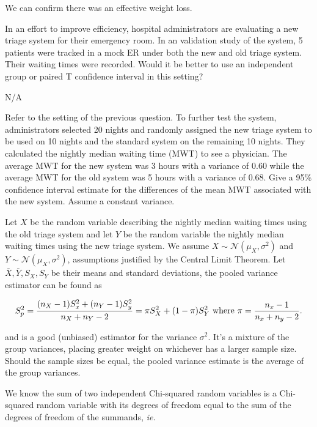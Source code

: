 \documentclass{homework}
\begin{document}
We can confirm there was an effective weight loss. \\

\begin{tcolorbox}[title=Question 4]
In an effort to improve efficiency, hospital administrators are evaluating a new triage system for their emergency room. In an validation study of the system, 5 patients were tracked in a mock ER under both the new and old triage system. Their waiting times were recorded. Would it be better to use an independent group or paired T confidence interval in this setting?
\end{tcolorbox}

N/A

\begin{tcolorbox}[title=Question 5]
Refer to the setting of the previous question. To further test the system, administrators selected 20 nights and randomly assigned the new triage system to be used on 10 nights and the standard system on the remaining 10 nights. They calculated the nightly median waiting time (MWT) to see a physician. The average MWT for the new system was 3 hours with a variance of 0.60 while the average MWT for the old system was 5 hours with a variance of 0.68. Give a 95\% confidence interval estimate for the differences of the mean MWT associated with the new system. Assume a constant variance.
\end{tcolorbox}

Let $X$ be the random variable describing the
nightly median waiting times using the old triage system and let $Y$ be the random variable the
nightly median waiting times using the new triage system. We assume $X \sim \mathcal{N}(\mu_X, \sigma^2)$ and $Y \sim \mathcal{N}(\mu_X, \sigma^2)$, assumptions justified by the Central Limit Theorem. Let $\bar X, \bar Y, S_X, S_Y$ be their means and standard deviations, the pooled variance estimator can be found as

$$
S_p^2 = \frac{(n_X-1)S_x^2 + (n_Y-1)S_y^2 }{n_X+n_Y-2} = \pi S_X^2 + (1-\pi) S_Y^2 \textnormal{  where } \pi = \frac{n_x-1}{n_x+n_y-2}.
$$

and is a good (unbiased) estimator for the variance $\sigma^2$. It's a mixture of the group variances, placing greater weight on whichever has a larger sample size. Should the sample sizes be equal, the pooled variance estimate is the average of the group variances. 

We know the sum of two independent Chi-squared random variables is a Chi-squared random variable with its degrees of freedom equal to the sum of the degrees of freedom of the summands, \textit{ie.} 
\end{document}
